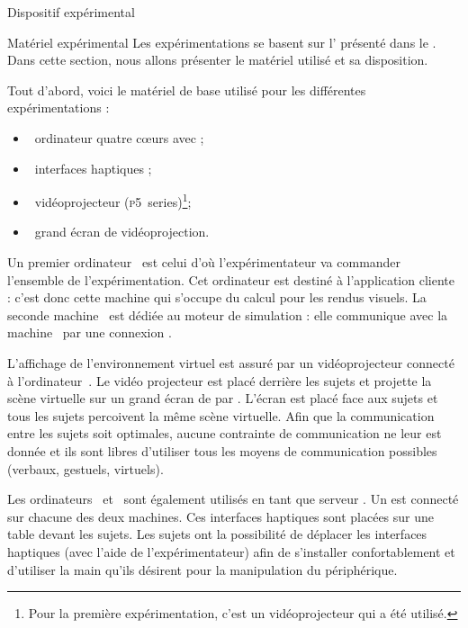 \documentclass[myfrancais]{mythesis}
\begin{document}
	\begin{mychapter}{Dispositif expérimental}
		\begin{mysection}{Matériel expérimental}
			Les expérimentations se basent sur l' présenté dans le .
			Dans cette section, nous allons présenter le matériel utilisé et sa disposition.

			Tout d'abord, voici le matériel de base utilisé pour les différentes expérimentations :
			\begin{itemize}
				\item {}~ordinateur quatre cœurs \myIntelCore avec ;
				\item {}~interfaces haptiques \myOmni;
				\item {}~vidéoprojecteur \myACER (\textsc{p5}~series)\footnote{Pour la première expérimentation, c'est un vidéoprojecteur \myCasioXJ qui a été utilisé.};
				\item {}~grand écran de vidéoprojection.
			\end{itemize}

			Un premier ordinateur~ est celui d'où l'expérimentateur va commander l'ensemble de l'expérimentation.
			Cet ordinateur est destiné à l'application cliente  : c'est donc cette machine qui s'occupe du calcul pour les rendus visuels.
			La seconde machine~ est dédiée au moteur de simulation  : elle communique avec la machine~ par une connexion \myTCPIP.

			L'affichage de l'environnement virtuel est assuré par un vidéoprojecteur connecté à l'ordinateur~.
			Le vidéo projecteur est placé derrière les sujets et projette la scène virtuelle sur un grand écran de  par .
			L'écran est placé face aux sujets et tous les sujets percoivent la même scène virtuelle.
			Afin que la communication entre les sujets soit optimales, aucune contrainte de communication ne leur est donnée et ils sont libres d'utiliser tous les moyens de communication possibles (verbaux, gestuels, virtuels\myetc).

			Les ordinateurs~ et~ sont également utilisés en tant que serveur .
			Un \myOmni est connecté sur chacune des deux machines.
			Ces interfaces haptiques sont placées sur une table devant les sujets.
			Les sujets ont la possibilité de déplacer les interfaces haptiques (avec l'aide de l'expérimentateur) afin de s'installer confortablement et d'utiliser la main qu'ils désirent pour la manipulation du périphérique.


\end{mysection}
\end{mychapter}
\end{document}
